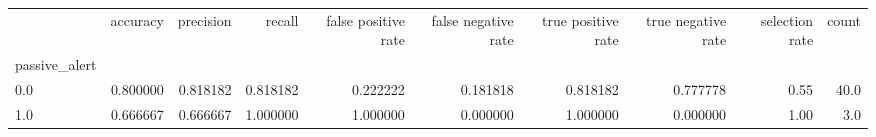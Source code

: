 \begin{tabular}{lrrrrrrrrr}
\toprule
{} &  accuracy &  precision &    recall &  false positive rate &  false negative rate &  true positive rate &  true negative rate &  selection rate &  count \\
passive\_alert &           &            &           &                      &                      &                     &                     &                 &        \\
\midrule
0.0           &  0.800000 &   0.818182 &  0.818182 &             0.222222 &             0.181818 &            0.818182 &            0.777778 &            0.55 &   40.0 \\
1.0           &  0.666667 &   0.666667 &  1.000000 &             1.000000 &             0.000000 &            1.000000 &            0.000000 &            1.00 &    3.0 \\
\bottomrule
\end{tabular}
